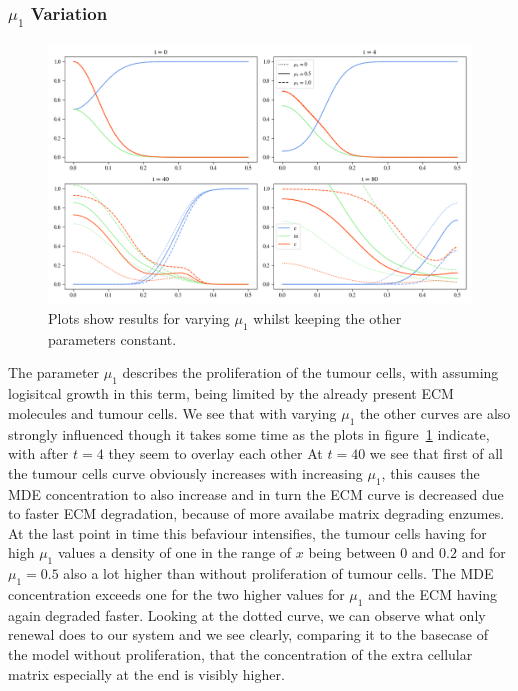 \subsubsection*{$\mu_1$ Variation}
\begin{figure}[h]
    \centering
    \includegraphics[width=\textwidth]{resources/images/prolif_mu_1_variation.png}
    \caption{Plots show results for varying $\mu_1$ whilst keeping the other parameters constant.}
    \label{fig:prolif_mu_1_variation}
\end{figure}

The parameter $\mu_1$ describes the proliferation of the tumour cells, with assuming logisitcal growth in this term, being limited by the already present ECM molecules and tumour cells. We see that with varying $\mu_1$ the other curves are also strongly influenced though it takes some time as the plots in figure~\ref{fig:prolif_mu_1_variation} indicate, with after $t=4$ they seem to overlay each other At $t=40$ we see that first of all the tumour cells curve obviously increases with increasing $\mu_1$, this causes the MDE concentration to also increase and in turn the ECM curve is decreased due to faster ECM degradation, because of more availabe matrix degrading enzumes. At the last point in time this befaviour intensifies, the tumour cells having for high $\mu_1$ values a density of one in the range of $x$ being between $0$ and $0.2$ and for $\mu_1=0.5$ also a lot higher than without proliferation of tumour cells. The MDE concentration exceeds one for the two higher values for $\mu_1$ and the ECM having again degraded faster. Looking at the dotted curve, we can observe what only renewal does to our system and we see clearly, comparing it to the basecase of the model without proliferation, that the concentration of the extra cellular matrix especially at the end is visibly higher.



